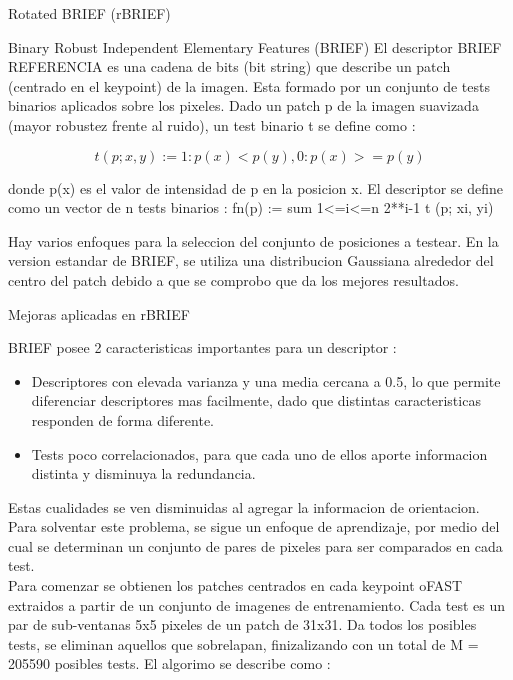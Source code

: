 \begin{subsection}
\begin{subsection}
\begin{enumerate}
\end{enumerate}

\end{subsection}

\begin{subsection}
{Rotated BRIEF (rBRIEF) }

\begin{subsection}
{Binary Robust Independent Elementary Features (BRIEF) }
El descriptor BRIEF REFERENCIA es una cadena de bits (bit string) que describe un patch (centrado en el keypoint) de la imagen. Esta formado por un conjunto de tests binarios aplicados sobre los pixeles. Dado un patch p de la imagen suavizada (mayor robustez frente al ruido), un test binario t se define como : 

\begin{equation}
t(p; x, y) := { 1 : p(x) < p(y), 0 : p(x) >= p(y) }
\end{equation}

donde p(x) es el valor de intensidad de p en la posicion x.
El descriptor se define como un vector de n tests binarios :
fn(p) := sum 1<=i<=n 2**i-1 t (p; xi, yi) 

Hay varios enfoques para la seleccion del conjunto de posiciones a testear. En la version estandar de BRIEF, se utiliza una distribucion Gaussiana alrededor del centro del patch debido a que se comprobo que da los mejores resultados.

\end{subsection}

\begin{subsection}
{Mejoras aplicadas en rBRIEF}

BRIEF posee 2 caracteristicas importantes para un descriptor :
\begin{itemize}

\item Descriptores con elevada varianza y una media cercana a 0.5, lo que permite diferenciar descriptores mas facilmente, dado que distintas caracteristicas responden de forma diferente.

\item Tests poco correlacionados, para que cada uno de ellos aporte informacion distinta y disminuya la redundancia.

\end{itemize}

Estas cualidades se ven disminuidas al agregar la informacion de orientacion. Para solventar este problema, se sigue un enfoque de aprendizaje, por medio del cual se determinan un conjunto de pares de pixeles para ser comparados en cada test. \\
Para comenzar se obtienen los patches centrados en cada keypoint oFAST extraidos a partir de un conjunto de imagenes de entrenamiento. Cada test es un par de sub-ventanas 5x5 pixeles de un patch de 31x31. Da todos los posibles tests, se eliminan aquellos que sobrelapan, finizalizando con un total de M = 205590 posibles tests.
El algorimo se describe como : 


\end{subsection}
\end{subsection}
\end{subsection}
